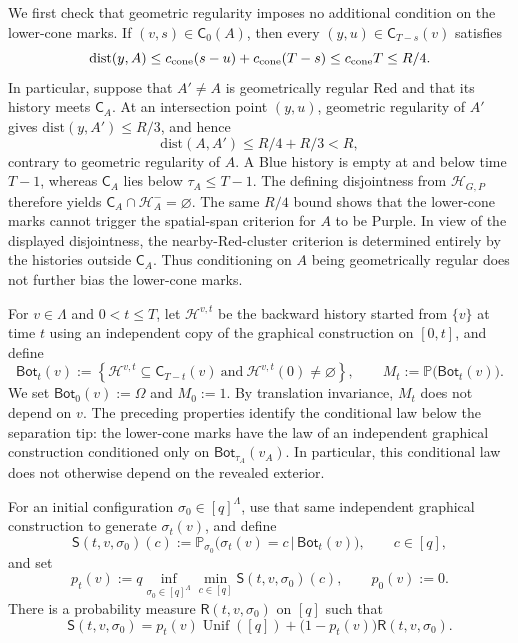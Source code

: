 \documentclass[letterpaper,11pt,reqno]{amsart}
\theoremstyle{definition}
\newcommand{\eset}{\varnothing}
\newcommand{\dist}{\mathrm{dist}}
\begin{document}
We first check that geometric regularity imposes no additional condition on
the lower-cone marks. If \((v,s)\in\mathsf C_0(A)\), then every
\((y,u)\in\mathsf C_{T-s}(v)\) satisfies
\[
\dist(y,A)
\le c_{\rm cone}(s-u)+c_{\rm cone}(T-s)
\le c_{\rm cone}T
\le R/4.
\]
In particular, suppose that \(A'\ne A\) is geometrically regular Red and that
its history meets \(\mathsf C_A\). At an intersection point \((y,u)\),
geometric regularity of \(A'\) gives \(\dist(y,A')\le R/3\), and hence
\[
\dist(A,A')\le R/4+R/3<R,
\]
contrary to geometric regularity of \(A\). A Blue history is empty at and
below time \(T-1\), whereas \(\mathsf C_A\) lies below
\(\tau_A\le T-1\). The defining disjointness from
\(\mathcal H_{G,P}\) therefore yields
$\mathsf C_A\cap\mathcal H_A^-=\eset$.
The same \(R/4\) bound shows that the lower-cone marks cannot trigger the
spatial-span criterion for \(A\) to be Purple. In view of the displayed
disjointness, the nearby-Red-cluster criterion is determined entirely by the
histories outside \(\mathsf C_A\). Thus conditioning on \(A\) being
geometrically regular does not further bias the lower-cone marks.



For \(v\in\Lambda\) and \(0<t\le T\), let \(\mathcal H^{v,t}\) be the backward
history started from \(\{v\}\) at time \(t\) using an independent copy of the
graphical construction on \([0,t]\), and define
\[
\mathsf{Bot}_t(v)
:=
\left\{
\mathcal H^{v,t}\subseteq\mathsf C_{T-t}(v)
\ \text{and}\
\mathcal H^{v,t}(0)\ne\varnothing
\right\},
\qquad
M_t:=\mathbb P\bigl(\mathsf{Bot}_t(v)\bigr).
\]
We set $\mathsf{Bot}_0(v):=\Omega$ and $M_0:=1$.
By translation invariance, \(M_t\) does not depend on \(v\).
%
The preceding properties identify the conditional law below the separation
tip: the lower-cone marks have the law of an independent
graphical construction conditioned only on
\(\mathsf{Bot}_{\tau_A}(v_A)\). In particular, this conditional law does not
otherwise depend on the revealed exterior.


%
For an initial configuration \(\sigma_0\in[q]^\Lambda\), use that same
independent graphical construction to generate \(\sigma_t(v)\), and define
\[
\mathsf S(t,v,\sigma_0)(c)
:=
\mathbb P_{\sigma_0}\bigl(
\sigma_t(v)=c
\,\big|\,
\mathsf{Bot}_t(v)
\bigr),
\qquad c\in[q],
\]
and set
\[
p_t(v)
:=
q\inf_{\sigma_0\in[q]^\Lambda}
\min_{c\in[q]}\mathsf S(t,v,\sigma_0)(c),
\qquad p_0(v):=0.
\]
There is a probability measure \(\mathsf R(t,v,\sigma_0)\) on \([q]\) such that
\[
\mathsf S(t,v,\sigma_0)
=
p_t(v)\operatorname{Unif}([q])
+
\bigl(1-p_t(v)\bigr)\mathsf R(t,v,\sigma_0).
\]
\end{document}
